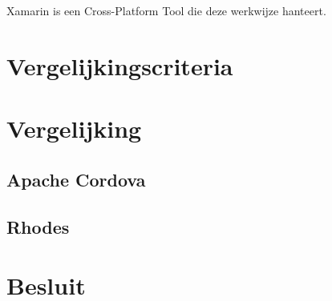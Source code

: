 \documentclass[a4paper,conference]{IEEEconf}
\begin{document}
Xamarin is een Cross-Platform Tool die deze werkwijze hanteert.

\section{Vergelijkingscriteria}

\section{Vergelijking}

\subsection{Apache Cordova}

\subsection{Rhodes}

\section{Besluit}

\printbibliography
\end{document}

